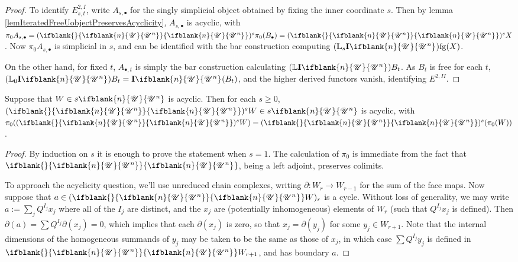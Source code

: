\documentclass[10pt]{article}
\newcommand{\nontop}[1]{\ifblank{#1}{\scrU}{\scrU^{#1}}}
\newcommand{\Ind}[2][]{\mathbf{I}{#2}_{#1}}%
\newcommand{\forget}{\mathrm{fg}}
\newcommand{\Fr}[2][]{\ifblank{#1}{#2}{#2_{#1}}}
\newcommand{\derived}{\mathbb{L}}
\begin{document}
\begin{GrothendieckSpectralSequencestake2}
\begin{proof}
To identify ${E}^{2,I}_{s,t}$, write $A_{s,\bullet}$ for the singly simplicial object obtained by fixing the inner coordinate $s$. Then by lemma \ref{lemIteratedFreeUobjectPreservesAcyclicity}, $A_{s,\bullet}$ is acyclic, with $\pi_0 A_{s,\bullet}=(\Fr{\nontop{n}})^s\pi_0(B_\bullet)= (\Fr{\nontop{n}})^sX$. Now $\pi_0 A_{s,\bullet}$ is simplicial in $s$, and can be identified with the bar construction computing $(\derived_s{\Ind{\nontop{n}}})\forget(X)$.

On the other hand, for fixed $t$, $A_{\bullet,t}$ is simply the bar construction calculating $(\derived\Ind{\nontop{n}})B_t$. As $B_t$ is free for each $t$, $(\derived_0\Ind{\nontop{n}})B_t=\Ind{\nontop{n}}(B_t)$, and the higher derived functors vanish, identifying $E^{2,II}$.
\end{proof}
\begin{lem}\label{lemIteratedFreeUobjectPreservesAcyclicity}
Suppose that $W\in s\nontop{n}$ is acyclic. Then for each $s\geq0$,  $(\Fr{\nontop{n}})^sW\in s\nontop{n}$ is acyclic, with $\pi_0((\Fr{\nontop{n}})^sW)=(\Fr{\nontop{n}})^s(\pi_0(W))$.
\end{lem}
\begin{proof}
By induction on $s$ it is enough to prove the statement when $s=1$. The calculation of $\pi_0$ is immediate from the fact that $\Fr{\nontop{n}}$, being a left adjoint, preserves colimits.

To approach the acyclicity question, we'll use unreduced chain complexes, writing $\partial:W_r\to W_{r-1}$ for the sum of the face maps. Now suppose that $a\in(\Fr{\nontop{n}}W)_r$ is a cycle. Without loss of generality, we may write
$a:=\sum_j Q^{I_j}x_j$
where all of the $I_j$ are distinct, and the $x_j$ are (potentially inhomogeneous) elements of $W_r$ (such that $Q^{I_j}x_j$ is defined). Then $\partial (a)=\sum Q^{I_j}\partial(x_j)=0$, which implies that each $\partial(x_j)$ is zero, so that $x_j=\partial(y_j)$ for some $y_j\in W_{r+1}$. Note that the internal dimensions of the homogeneous summands of $y_j$ may be taken to be the same as those of $x_j$, in which case $\sum Q^{I_j}y_j$ is defined in $\Fr{\nontop{n}}W_{r+1}$, and has boundary $a$.
\end{proof}
\end{GrothendieckSpectralSequencestake2}
\end{document}
